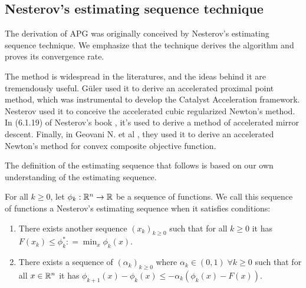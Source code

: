 \documentclass[12pt]{article}
\begin{document}
    \subsection{Nesterov's estimating sequence technique}
        The derivation of APG was originally conceived by Nesterov's estimating sequence technique. 
        We emphasize that the technique derives the algorithm and proves its convergence rate. 
        \par
        The method is widespread in the literatures, and the ideas behind it are tremendously useful. 
        Güler \cite{guler_new_1992} used it to derive an accelerated proximal point method, which was instrumental to develop the Catalyst Acceleration framework. 
        Nesterov \cite{nesterov_accelerating_2008} used it to conceive the accelerated cubic regularized Newton's method. 
        In (6.1.19) of Nesterov's book \cite{nesterov_lectures_2018}, it's used to derive a method of accelerated mirror descent. 
        Finally, in Geovani N. et al \cite{grapiglia_accelerated_2019}, they used it to derive an accelerated Newton's method for convex composite objective function. 
        \par
        The definition of the estimating sequence that follows is based on our own understanding of the estimating sequence. 
        \begin{definition}\label{def:nes-est-seq}
            For all $k \ge 0$, let $\phi_k : \mathbb R^n \rightarrow\mathbb R$ be a sequence of functions. 
            We call this sequence of functions a Nesterov's estimating sequence when it satisfies conditions: 
            \begin{enumerate}
                \item There exists another sequence $(x_k)_{k \ge 0}$ such that for all $k \ge 0$ it has $F(x_k) \le \phi_k^*: =\min_{x}\phi_k(x)$. 
                \item There exists a sequence of $(\alpha_k)_{k \ge 0}$ where $\alpha_k \in (0, 1)\; \forall k \ge0 $ such that for all $x \in \mathbb R^n$ it has $\phi_{k + 1}(x) - \phi_k(x) \le - \alpha_k(\phi_k(x) - F(x))$. 
            \end{enumerate}
        \end{definition}
\end{document}
